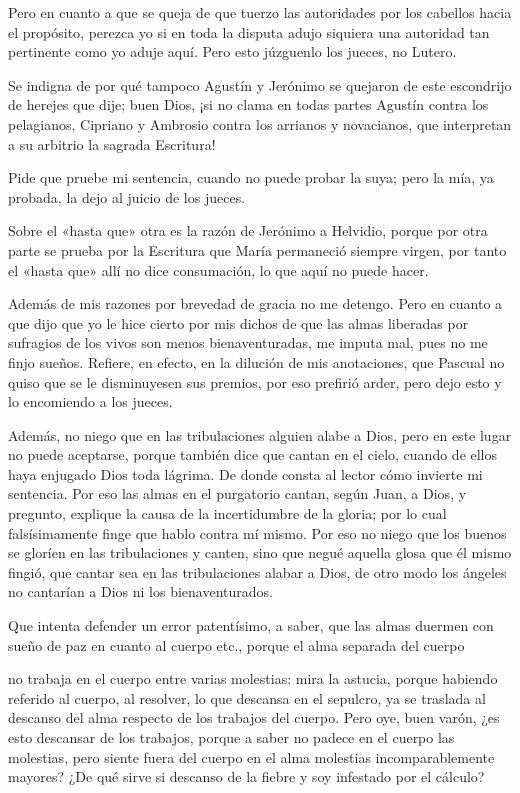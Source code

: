 Pero en cuanto a que se queja de que tuerzo las autoridades por los cabellos hacia el propósito, perezca yo si en toda la disputa adujo siquiera una autoridad tan pertinente como yo aduje aquí. Pero esto júzguenlo los jueces, no Lutero.

Se indigna de por qué tampoco Agustín y Jerónimo se quejaron de este escondrijo de herejes que dije; buen Dios, ¡si no clama en todas partes Agustín contra los pelagianos, Cipriano y Ambrosio contra los arrianos y novacianos, que interpretan a su arbitrio la sagrada Escritura!

Pide que pruebe mi sentencia, cuando no puede probar la suya; pero la mía, ya probada, la dejo al juicio de los jueces.

Sobre el «hasta que» otra es la razón de Jerónimo a Helvidio, porque por otra parte se prueba por la Escritura que María permaneció siempre virgen, por tanto el «hasta que» allí no dice consumación, lo que aquí no puede hacer.

Además de mis razones por brevedad de gracia no me detengo. Pero en cuanto a que dijo que yo le hice cierto por mis dichos de que las almas liberadas por sufragios de los vivos son menos bienaventuradas, me imputa mal, pues no me finjo sueños. Refiere, en efecto, en la dilución de mis anotaciones, que Pascual no quiso que se le disminuyesen sus premios, por eso prefirió arder, pero dejo esto y lo encomiendo a los jueces.

Además, no niego que en las tribulaciones alguien alabe a Dios, pero en este lugar no puede aceptarse, porque también dice que cantan en el cielo, cuando de ellos haya enjugado Dios toda lágrima. De donde consta al lector cómo invierte mi sentencia. Por eso las almas en el purgatorio cantan, según Juan, a Dios, y pregunto, explique la causa de la incertidumbre de la gloria; por lo cual falsísimamente finge que hablo contra mí mismo. Por eso no niego que los buenos se gloríen en las tribulaciones y canten, sino que negué aquella glosa que él mismo fingió, que \marginpar{\small[344]} cantar sea en las tribulaciones alabar a Dios, de otro modo los ángeles no cantarían a Dios ni los bienaventurados.

Que intenta defender un error patentísimo, a saber, que las almas duermen con sueño de paz en cuanto al cuerpo etc., porque el alma separada del cuerpo

no trabaja en el cuerpo entre varias molestias: mira la astucia, porque habiendo referido al cuerpo, al resolver, lo que descansa en el sepulcro, ya se traslada al descanso del alma respecto de los trabajos del cuerpo. Pero oye, buen varón, ¿es esto descansar de los trabajos, porque a saber no padece en el cuerpo las molestias, pero siente fuera del cuerpo en el alma molestias incomparablemente mayores? ¿De qué sirve si descanso de la fiebre y soy infestado por el cálculo?

